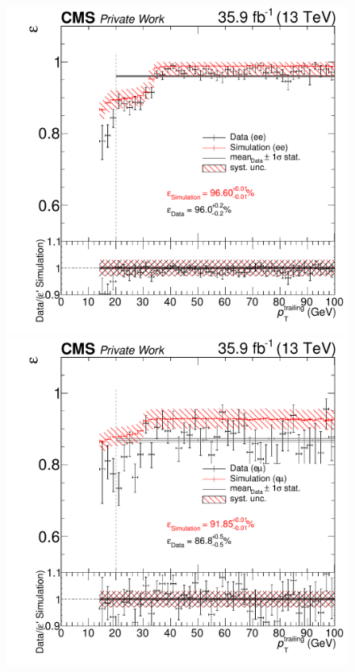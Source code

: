 \begin{figure}[htb]
 \centering
 \includegraphics[width=\pairwidth]{figures/triggerStudies/efficiency_dataHT_trigDilep_EE_pt2}
 \includegraphics[width=\pairwidth]{figures/triggerStudies/efficiency_dataHT_trigDilep_EM_pt2}

\end{figure}
